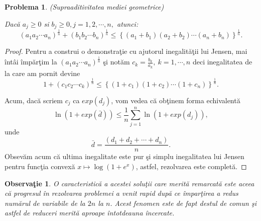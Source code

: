 \documentclass[a4paper,12pt,oneside]{report}
\newtheorem{problem}{Problema}
\newtheorem{remark}{Observa\c{t}ie}
\begin{document}
\begin{problem} (Supraaditivitatea mediei geometrice)
	
Dac\u{a} \(a_{j}\geq 0 \) si \(b_{j}\geq 0, j = 1 , 2, \cdots, n,\) atunci:
\begin{displaymath}
  \left ( a_{1}a_{2}\cdots a_{n} \right )^{\frac{1}{n}} + \left ( b_{1}b_{2}\cdots b_{n} \right )^{\frac{1}{n}} \leq  \left \{ \left ( a_{1} + b_{1}\right ) \left ( a_{2} + b_{2} \right )\cdots \left ( a_{n} + b_{n} \right )\right \}^{\frac{1}{n}}.
\end{displaymath}
\end{problem}
	\begin{proof}
	Pentru a construi o demonstra\c{t}ie cu ajutorul inegalit\u{a}\c{t}ii lui Jensen, mai \^{i}nt\^{a}i \^{i}mp\u{a}r\c{t}im la
\(\left ( a_{1}a_{2}\cdots a_{n} \right )^{\frac{1}{n}}\) \c{s}i not\u{a}m \(c_{k}=\frac{b_{k}}{a_{k}},~k=1,\cdots, n\) deci inegalitatea de la care am pornit devine
\begin{displaymath}
  1 + \left ( c_{1}c_{2} \cdots c_{k}\right )^{\frac{1}{n}}\leq \left \{ \left ( 1 + c_{1} \right )\left ( 1 + c_{2} \right )\cdots \left ( 1 + c_{n} \right ) \right \}^{\frac{1}{n}}.
\end{displaymath}

Acum, dac\u{a} scriem \(c_{j}\) ca \(exp\left (d _{j} \right )\), vom vedea c\u{a} ob\c{t}inem forma echivalent\u{a}
\begin{displaymath}
  \ln\left ( 1 + exp\left ( \bar{d} \right ) \right ) \leq \frac{1}{n}\sum_{j = 1}^{n}\ln\left ( 1 + exp\left ( d_{j} \right ) \right ),
\end{displaymath}
unde
\begin{displaymath}
  \bar{d} = \frac{\left ( d_{1} + d_{2}  + \cdots + d_{n}\right )}{n}.
\end{displaymath}
Obsev\u{a}m acum c\u{a} ultima inegalitate este pur \c{s}i simplu inegalitatea lui Jensen pentru func\c{t}ia convex\u{a} \(x \mapsto \log \left ( 1 + e^{x} \right )\), astfel, rezolvarea este complet\u{a}.
\end{proof}
\begin{remark}
O caracteristic\u{a} a acestei solu\c{t}ii care merit\u{a} remarcat\u{a} este aceea c\u{a} progresul \^{i}n rezolvarea problemei a venit rapid dup\u{a} ce \^{i}mpar\c{t}irea a redus num\u{a}rul de variabile de la \(2n\) la \(n\). Acest fenomen este de fapt destul de comun \c{s}i astfel de reduceri merit\u{a} aproape \^{i}ntotdeauna \^{i}ncercate.
\end{remark}
\end{document}
